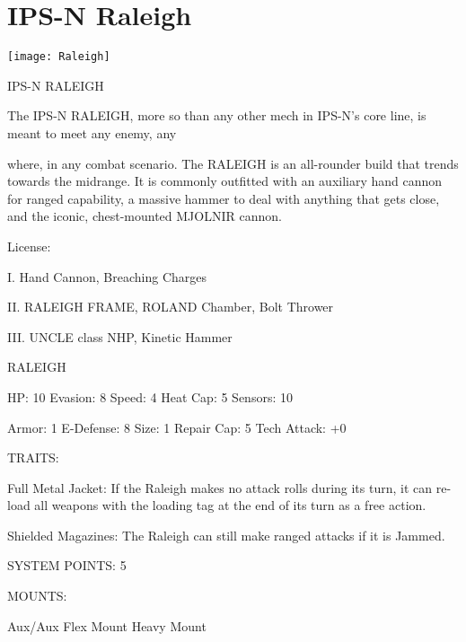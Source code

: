 \section{IPS-N Raleigh}

\begin{center}
    \texttt{[image: Raleigh]}
\end{center}

                                              IPS-N RALEIGH

The IPS-N RALEIGH, more so than any other mech in IPS-N’s core line, is meant to meet any enemy, any

where, in any combat scenario. The RALEIGH is an all-rounder build that trends towards the midrange. It is
commonly outfitted with an auxiliary hand cannon for ranged capability, a massive hammer to deal with
anything that gets close, and the iconic, chest-mounted MJOLNIR cannon.

                                                      License:

I. Hand Cannon, Breaching Charges

II. RALEIGH FRAME, ROLAND Chamber, Bolt Thrower

III. UNCLE class NHP, Kinetic Hammer





                                                    RALEIGH

  HP: 10          Evasion: 8                              Speed: 4            Heat Cap: 5         Sensors: 10

  Armor: 1        E-Defense: 8                            Size: 1             Repair Cap: 5       Tech Attack:
                                                                                                  +0

                                                      TRAITS:

  Full Metal Jacket: If the Raleigh makes no attack rolls during its turn, it can re-load all weapons with
  the loading tag at the end of its turn as a free action.

  Shielded Magazines: The Raleigh can still make ranged attacks if it is Jammed.

                                               SYSTEM POINTS: 5

                                                     MOUNTS:

  Aux/Aux                             Flex Mount                              Heavy Mount

